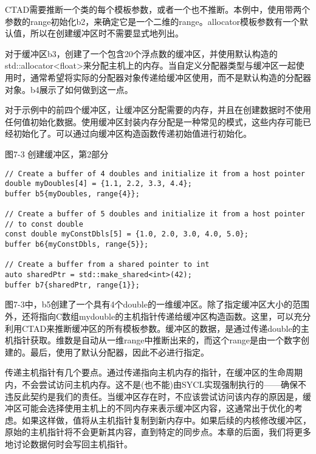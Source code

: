 CTAD需要推断一个类的每个模板参数，或者一个也不推断。本例中，使用带两个参数的range初始化b2，来确定它是一个二维的range。allocator模板参数有一个默认值，所以在创建缓冲区时不需要显式地列出。\par

对于缓冲区b3，创建了一个包含20个浮点数的缓冲区，并使用默认构造的std::allocator<float>来分配主机上的内存。当自定义分配器类型与缓冲区一起使用时，通常希望将实际的分配器对象传递给缓冲区使用，而不是默认构造的分配器对象。b4展示了如何做到这一点。\par

对于示例中的前四个缓冲区，让缓冲区分配需要的内存，并且在创建数据时不使用任何值初始化数据。使用缓冲区封装内存分配是一种常见的模式，这些内存可能已经初始化了。可以通过向缓冲区构造函数传递初始值进行初始化。\par

\hspace*{\fill} \par %
图7-3 创建缓冲区，第2部分
\begin{lstlisting}[caption={}]
// Create a buffer of 4 doubles and initialize it from a host pointer
double myDoubles[4] = {1.1, 2.2, 3.3, 4.4};
buffer b5{myDoubles, range{4}};

// Create a buffer of 5 doubles and initialize it from a host pointer 
// to const double
const double myConstDbls[5] = {1.0, 2.0, 3.0, 4.0, 5.0};
buffer b6{myConstDbls, range{5}};

// Create a buffer from a shared pointer to int
auto sharedPtr = std::make_shared<int>(42);
buffer b7{sharedPtr, range{1}};
\end{lstlisting}

图7-3中，b5创建了一个具有4个double的一维缓冲区。除了指定缓冲区大小的范围外，还将指向C数组mydouble的主机指针传递给缓冲区构造函数。这里，可以充分利用CTAD来推断缓冲区的所有模板参数。缓冲区的数据，是通过传递double的主机指针获取。维数是自动从一维range中推断出来的，而这个range是由一个数字创建的。最后，使用了默认分配器，因此不必进行指定。\par

传递主机指针有几个要点。通过传递指向主机内存的指针，在缓冲区的生命周期内，不会尝试访问主机内存。这不是(也不能)由SYCL实现强制执行的——确保不违反此契约是我们的责任。当缓冲区存在时，不应该尝试访问该内存的原因是，缓冲区可能会选择使用主机上的不同内存来表示缓冲区内容，这通常出于优化的考虑。如果这样做，值将从主机指针复制到新内存中。如果后续的内核修改缓冲区，原始的主机指针将不会更新其内容，直到特定的同步点。本章的后面，我们将更多地讨论数据何时会写回主机指针。\par

